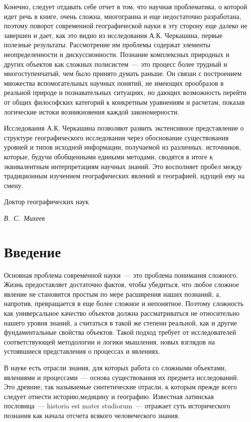 \documentclass[14pt,draft,openany]{extbook}
\begin{document}
Конечно, следует отдавать себе отчет в том, что научная проблематика, о которой идет речь в книге, очень сложна, многогранна и еще недостаточно разработана, поэтому поворот современной географической науки в эту сторону еще далеко не завершен и дает, как это видно из исследования А.К. Черкашина, первые полезные результаты. Рассмотрение им проблемы содержат элементы неопределенности и дискуссионности. Познание комплексных природных и других объектов как сложных полисистем~--- это процесс более трудный и многоступенчатый, чем было принято думать раньше. Он связан с построением миожества вспомогательных научных понятий, не имеющих прообразов в реальной природе и познавательных ситуациях, но дающих возможность перейти от общих философских категорий к конкретным уравнениям и расчетам, показав логические истоки возникновения каждой закономерности.

Исследования А.К. Черкашина позволяют развить экстенсивное представление о структуре географического исследования через обоснование существования уровней и типов исходной информации, получаемой из различных. источников, которые, будучи обобщенными едиными методами, сводятся в итоге к эквивалентным интерпретациям научных знаний. Это восполняет пробел между традиционным изучением географических явлений и географией, идущей ему на смену.

\begin{flushright}
\small{}
Доктор географических наук\par{}
\itshape{}
В.~С.~Михеев
\end{flushright}

\chapter*{Введение}

Основная проблема современной науки~--- это проблема понимания сложного. Жизнь предоставляет достаточно фактов, чтобы убедиться, что любое сложное явление не становится простым по мере расширения наших познаний, а, напротив, превращается в еще более сложное и непонятное. Поэтому сложность как универсальное качество объектов должна рассматриваться не относительно нашего уровня знаний, а считаться в такой же степени реальной, как и другие фундаментальные свойства объектов. Такой подход требует от исследователей соответствующей методологии и логики мышления, новых взглядов на устоявшиеся представления о процессах и явлениях.

В науке есть отрасли знания, для которых работа со сложными объектами, явлениями и процессами~--- основа существования их предмета исследований. Это древние, так называемые синтетические отрасли, к которым прежде всего следует отнести историю,медицину и географию. Известная латинская пословица~--- historia est mater studiorum~--- отражает суть исторического познания как начала отсчета всякого человеческого знания.
\end{document}
